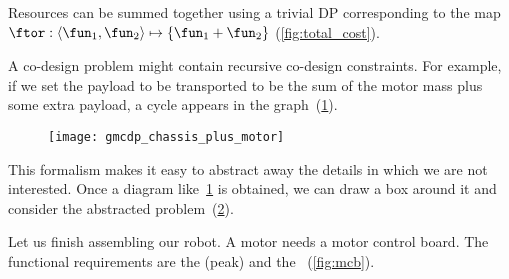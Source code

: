 \begin{example}
    Resources can be summed together using a trivial DP corresponding
    to the map $\ftor:\left\langle \fun_{1},\fun_{2}\right\rangle \mapsto\{\fun_{1}+\fun_{2}\}$
    (\cref{fig:total_cost}).

    \begin{marginfigure}
        \centering
        \caption{\label{fig:total_cost}}
    \end{marginfigure}



    A co-design problem might contain recursive co-design constraints.
    For example, if we set the payload to be transported to be the sum
    of the motor mass plus some extra payload, a cycle appears in the
    graph~(\cref{fig:gmcdp_chassis_plus_motor}).


    \begin{figure}[h]
        \centering{}\texttt{[image: gmcdp\_chassis\_plus\_motor]}
        \caption{\label{fig:gmcdp_chassis_plus_motor}}
    \end{figure}


    This formalism makes it easy to abstract away the details
    in which we are not interested. Once a diagram like~\cref{fig:gmcdp_chassis_plus_motor}
    is obtained, we can draw a box around it and consider the abstracted
    problem~(\cref{fig:gmcdp_chassis_plus_motor-1}).


    \begin{figure}[h!]
        \begin{center}
            \caption{\label{fig:gmcdp_chassis_plus_motor-1}}
        \end{center}
    \end{figure}


    \label{exa:finish}Let us finish assembling our robot. A motor needs
    a motor control board. The functional requirements are the (peak)
     and the ~(\cref{fig:mcb}).


\end{example}
